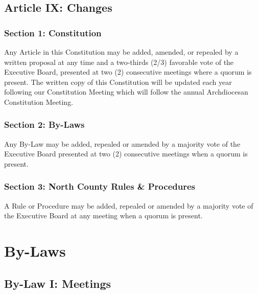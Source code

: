 \documentclass[letteraper,10pt,oneside,draft]{memoir}
\begin{document}
\section{Article IX: Changes}
\subsection{Section 1: Constitution}
Any Article in this Constitution may be added, amended, or repealed by a written proposal at any time and a two-thirds (2/3) favorable vote of the Executive Board, presented at two (2) consecutive meetings where a quorum is present.  The written copy of this Constitution will be updated each year following our Constitution Meeting which will follow the annual Archdiocesan Constitution Meeting.  

\subsection{Section 2: By-Laws}
Any By-Law may be added, repealed or amended by a majority vote of the Executive Board presented at two (2) consecutive meetings when a quorum is present.

\subsection{Section 3: North County Rules \& Procedures}
A Rule or Procedure may be added, repealed or amended by a majority vote of the Executive Board at any meeting when a quorum is present.

\chapter{By-Laws}
\section{By-Law I: Meetings}
\end{document}
